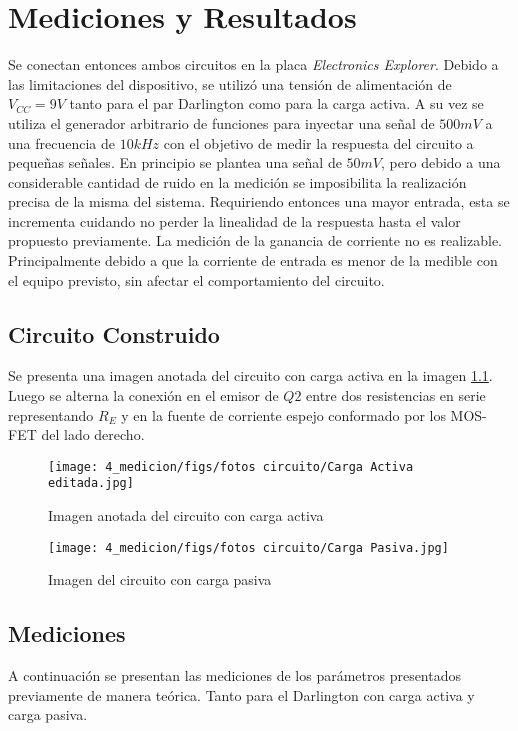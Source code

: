 \chapter{Mediciones y Resultados}
Se conectan entonces ambos circuitos en la placa \textit{Electronics Explorer}. Debido a las limitaciones del dispositivo, se utilizó una tensión de alimentación de $V_{CC} = 9V$ tanto para el par Darlington como para la carga activa.
A su vez se utiliza el generador arbitrario de funciones para inyectar una señal de $500 mV$ a una frecuencia de $10kHz$ con el objetivo de medir la respuesta del circuito a pequeñas señales. En principio se plantea una señal de $50 mV$, pero debido a una considerable cantidad de ruido en la medición se imposibilita la realización precisa de la misma del sistema.
Requiriendo entonces una mayor entrada, esta se incrementa cuidando no perder la linealidad de la respuesta hasta el valor propuesto previamente.
La medición de la ganancia de corriente no es realizable. Principalmente debido a que la corriente de entrada es menor de la medible con el equipo previsto, sin afectar el comportamiento del circuito.

\section{Circuito Construido}
Se presenta una imagen anotada del circuito con carga activa en la imagen \ref{fig: foto circuito carga activa}. Luego se alterna la conexión en el emisor de $Q2$ entre dos resistencias en serie representando $R_E$ y en la fuente de corriente espejo conformado por los MOS-FET del lado derecho. 

\begin{figure}[ht]
    \centering
    \texttt{[image: 4\_medicion/figs/fotos circuito/Carga Activa editada.jpg]}
    \caption{Imagen anotada del circuito con carga activa}\label{fig: foto circuito carga activa}
\end{figure}
\begin{figure}[ht]
    \centering
    \texttt{[image: 4\_medicion/figs/fotos circuito/Carga Pasiva.jpg]}
    \caption{Imagen del circuito con carga pasiva}\label{fig: foto circuito carga pasiva}
\end{figure}


\section{Mediciones}
A continuación se presentan las mediciones de los parámetros presentados previamente de manera teórica. Tanto para el Darlington con carga activa y carga pasiva.

